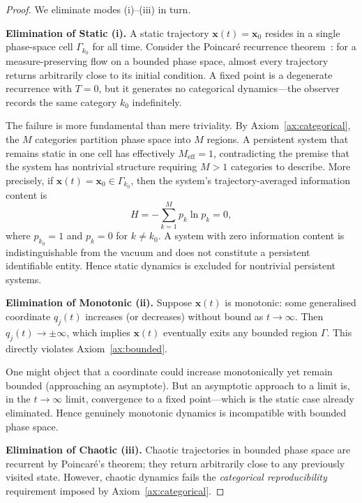 \documentclass[11pt,twocolumn,a4paper]{article}
\begin{document}
\begin{proof}
We eliminate modes (i)--(iii) in turn.

\medskip
\noindent\textbf{Elimination of Static (i).}
A static trajectory $\bm{x}(t) = \bm{x}_0$ resides in a single phase-space cell $\Gamma_{k_0}$ for all time. Consider the Poincar\'{e} recurrence theorem~\citep{poincare1890}: for a measure-preserving flow on a bounded phase space, almost every trajectory returns arbitrarily close to its initial condition. A fixed point is a degenerate recurrence with $T = 0$, but it generates no categorical dynamics---the observer records the same category $k_0$ indefinitely.

The failure is more fundamental than mere triviality. By Axiom~\ref{ax:categorical}, the $M$ categories partition phase space into $M$ regions. A persistent system that remains static in one cell has effectively $M_{\text{eff}} = 1$, contradicting the premise that the system has nontrivial structure requiring $M > 1$ categories to describe. More precisely, if $\bm{x}(t) = \bm{x}_0 \in \Gamma_{k_0}$, then the system's trajectory-averaged information content is
\begin{equation}
    H = -\sum_{k=1}^{M} p_k \ln p_k = 0,
\end{equation}
where $p_{k_0} = 1$ and $p_k = 0$ for $k \neq k_0$. A system with zero information content is indistinguishable from the vacuum and does not constitute a persistent identifiable entity. Hence static dynamics is excluded for nontrivial persistent systems.

\medskip
\noindent\textbf{Elimination of Monotonic (ii).}
Suppose $\bm{x}(t)$ is monotonic: some generalised coordinate $q_j(t)$ increases (or decreases) without bound as $t \to \infty$. Then $q_j(t) \to \pm\infty$, which implies $\bm{x}(t)$ eventually exits any bounded region $\Gamma$. This directly violates Axiom~\ref{ax:bounded}.

One might object that a coordinate could increase monotonically yet remain bounded (approaching an asymptote). But an asymptotic approach to a limit is, in the $t \to \infty$ limit, convergence to a fixed point---which is the static case already eliminated. Hence genuinely monotonic dynamics is incompatible with bounded phase space.

\medskip
\noindent\textbf{Elimination of Chaotic (iii).}
Chaotic trajectories in bounded phase space are recurrent by Poincar\'{e}'s theorem; they return arbitrarily close to any previously visited state. However, chaotic dynamics fails the \emph{categorical reproducibility} requirement imposed by Axiom~\ref{ax:categorical}.


\end{proof}
\end{document}
